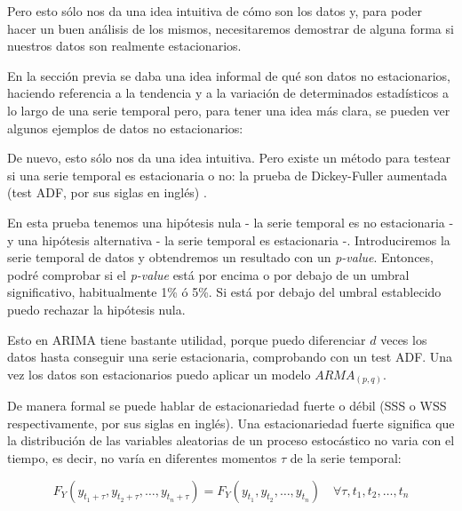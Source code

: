 
Pero esto sólo nos da una idea intuitiva de cómo son los datos y, para poder hacer un buen análisis de los mismos, necesitaremos demostrar de alguna forma si nuestros datos son realmente estacionarios. 

En la sección previa se daba una idea informal de qué son datos no estacionarios, haciendo referencia a la tendencia y a la variación de determinados estadísticos a lo largo de una serie temporal pero, para tener una idea más clara, se pueden ver algunos ejemplos de datos no estacionarios:



De nuevo, esto sólo nos da una idea intuitiva. Pero existe un método para testear si una serie temporal es estacionaria o no: la prueba de Dickey-Fuller aumentada (test ADF, por sus siglas en inglés) \citep{wiki:Dickey-Fuller}. 

En esta prueba tenemos una hipótesis nula - la serie temporal es no estacionaria - y una hipótesis alternativa - la serie temporal es estacionaria -. Introduciremos la serie temporal de datos y obtendremos un resultado con un \emph{p-value}. Entonces, podré comprobar si el \emph{p-value} está por encima o por debajo de un umbral significativo, habitualmente 1\% ó 5\%. Si está por debajo del umbral establecido puedo rechazar la hipótesis nula.

Esto en ARIMA tiene bastante utilidad, porque puedo diferenciar $d$ veces los datos hasta conseguir una serie estacionaria, comprobando con un test ADF. Una vez los datos son estacionarios puedo aplicar un modelo $ARMA_{(p, q)}$.

De manera formal se puede hablar de estacionariedad fuerte o débil (SSS o WSS respectivamente, por sus siglas en inglés)\citep{wiki:proceso_estacionario_en}. Una estacionariedad fuerte significa que la distribución de las variables aleatorias de un proceso estocástico no varia con el tiempo, es decir, no varía en diferentes momentos  $\tau$ de la serie temporal:

\begin{equation}
	F_{Y}(y_{t_{1}+\tau}, y_{t_{2}+\tau}, \ldots, y_{t_{n}+\tau}) = F_{Y}(y_{t_{1}}, y_{t_{2}}, \ldots, y_{t_{n}}) \quad \forall \tau, t_{1}, t_{2}, \ldots, t_{n}
\end{equation}

